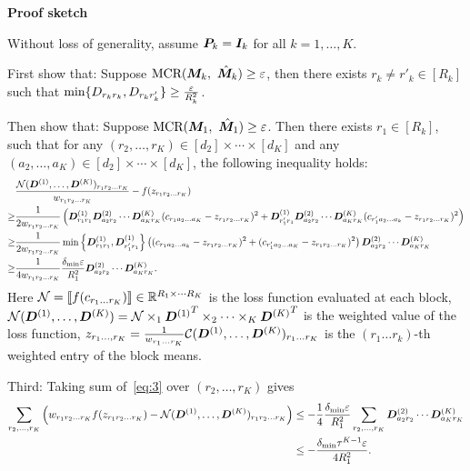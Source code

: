 \documentclass[11pt]{article}
\theoremstyle{plain}
\theoremstyle{definition}
\begin{document}
\begin{center}
{\bf \large Proof sketch}
\end{center}

Without loss of generality, assume $\bm{P}_k=\bm I_k$ for all $k=1,\ldots,K$. 
 
First show that: Suppose $\text{MCR}(\bm M_k,\ \hat {\bm M}_k)\geq \varepsilon$, then there exists $r_k\neq r'_k\in [R_k]$ such that $\min\{ D_{r_kr_k},D_{r_kr'_k}\} \geq {\varepsilon \over R_k^2}$.

Then show that: Suppose $\text{MCR}(\bm M_1,\ \hat {\bm M}_1)\geq \varepsilon$. Then there exists $r_1\in [R_k]$, such that for any $(r_2,\ldots,r_K)\in[d_2]\times \cdots \times [d_K]$ and any $(a_2,\ldots,a_K)\in[d_2]\times \cdots \times [d_K]$, the following inequality holds:
\begin{align}\label{eq:3}
&{ \mathcal{N} (\bm{D}^{(1)}, \ldots, \bm{D}^{(K)})_{r_1 r_2\ldots r_K}\over w_{r_1r_2\ldots r_K}} -f (z_{r_1r_2 \ldots r_K})\nonumber \\
\geq & {1\over 2w_{r_1r_2\ldots r_K}} \left( \bm{D}^{(1)}_{r_1r_1}\bm{D}^{(2)}_{a_2r_2}\cdots  \bm{D}^{(K)}_{a_Kr_K}(c_{r_1a_2\ldots a_K} -z_{r_1r_2\ldots r_K})^2+  \bm{D}^{(1)}_{r'_1r_1}\bm{D}^{(2)}_{a_2r_2}\cdots \bm{D}^{(K)}_{a_Kr_K}(c_{r'_1a_2\ldots a_k} -z_{r_1r_2\ldots r_K})^2\right) \nonumber\\
\geq &{1\over 2w_{r_1r_2\ldots r_K}} \min\left\{\bm{D}^{(1)}_{r_1r_1}, \bm{D}^{(1)}_{r'_1r_1}\right\}   \left ( (c_{r_1a_2\ldots a_k} -z_{r_1r_2\ldots r_K})^2+(c_{r'_1a_2\ldots a_K} -z_{r_1r_2\ldots r_K})^2  \right)\bm{D}^{(2)}_{a_2r_2}\cdots \bm{D}^{(K)}_{a_Kr_K} \nonumber\\
\geq & {1\over 4w_{r_1r_2\ldots r_K}}{\delta_{\min}\varepsilon \over R_1^2} \bm{D}^{(2)}_{a_2r_2}\cdots \bm{D}^{(K)}_{a_Kr_K}.
\end{align}
Here $\mathcal{N}=\llbracket f(c_{r_1 \ldots r_K}) \rrbracket\in\mathbb{R}^{R_1\times \cdots R_K}$ is the loss function evaluated at each block, $\mathcal{N} (\bm{D}^{(1)}, \ldots, \bm{D}^{(K)})=\mathcal{N}\times_1 {\bm{D}^{(1)}}^T\times_2\cdots\times_K {\bm{D}^{(K)}}^T$ is the weighted value of the loss function, $z_{r_1\ldots,r_K}={1\over w_{r_1\ldots r_K}}\mathcal{C}(\bm{D}^{(1)},\ldots,\bm{D}^{(K)})_{r_1\ldots r_K}$ is the $(r_1\ldots r_k)$-th weighted entry of the block means.

Third: Taking sum of~\eqref{eq:3} over $(r_2,\ldots,r_K)$ gives
\begin{align}\label{eq:1}
\sum_{r_2,\ldots,r_K}\left( w_{r_1 r_2 \ldots r_K}f(z_{r_1r_2\ldots r_K})-\mathcal{N}(\bm{D}^{(1)},\ldots,\bm{D}^{(K)})_{r_1 r_2\ldots r_K} \right)& \leq - {1\over 4} {\delta_{\min}\varepsilon \over R^2_1} \sum_{r_2,\ldots,r_K}\bm{D}^{(2)}_{a_2r_2}\cdots\bm{D}^{(K)}_{a_Kr_K}\nonumber\\
&\leq -{\delta_{\min} \tau^{K-1}\varepsilon\over 4 R^2_1}.
\end{align}
\end{document}
